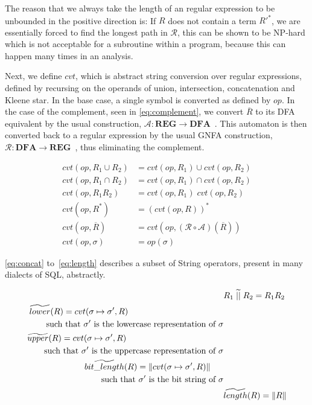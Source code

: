 The reason that we always take the length of an regular expression to be unbounded in the positive direction is: If $R$ does not contain a term $R'^*$, we are essentially forced to find the longest path in $\mathcal{R}$, this can be shown to be NP-hard which is not acceptable for a subroutine within a program, because this can happen many times in an analysis.

Next, we define $cvt$, which is abstract string conversion over regular expressions, defined by recursing on the operands of union, intersection, concatenation and Kleene star.
In the base case, a single symbol is converted as defined by $op$.
In the case of the complement, seen in \autoref{eq:complement}, we convert $\overline{R}$ to its DFA equivalent by the usual construction, $\mathcal{A}:\mathbf{REG} \rightarrow \mathbf{DFA}$~\cite{sipserbook}.
This automaton is then converted back to a regular expression by the usual GNFA construction, $\mathcal{R}: \mathbf{DFA} \rightarrow \mathbf{REG}$~\cite{sipserbook}, thus eliminating the complement.

\begin{align}
    cvt(op, R_1 \cup R_2) &= cvt(op, R_1) \cup cvt(op, R_2) \\
    cvt(op, R_1 \cap R_2) &= cvt(op, R_1) \cap cvt(op, R_2) \\
    cvt(op, R_1 R_2) &= cvt(op, R_1) \; cvt(op, R_2) \\
    cvt(op, R^*) &= (cvt(op, R))^* \\
    cvt(op, \overline{R}) &= cvt(op, (\mathcal{R} \circ \mathcal{A}) (\overline{R})) \label{eq:complement} \\
    cvt(op, \sigma) &= op(\sigma)
\end{align}

\autoref{eq:concat} to~\ref{eq:length} describes a subset of String operators, present in many dialects of SQL, abstractly.

\begin{align}
    &R_1 \;\aab{||}\; R_2 = R_1 R_2 \label{eq:concat} \\
    \begin{split}
        &\aab{lower}(R) = cvt(\sigma \mapsto \sigma', R) \\
        & \quad \quad \text{such } \text{that } \sigma' \text{ is the lowercase representation of } \sigma
    \end{split}\\
    \begin{split}
        & \aab{upper}(R) = cvt(\sigma \mapsto \sigma', R) \\
        & \quad \quad \text{such } \text{that $\sigma'$ is the uppercase representation of $\sigma$}
    \end{split}\\
    \begin{split}
        &\aab{bit\_length}(R) = \|cvt(\sigma \mapsto \sigma', R)\| \\
        & \quad \quad \text{such } \text{that $\sigma'$ is the bit string of $\sigma$}
    \end{split} \\ \label{eq:length}
    &\aab{length}(R) = \|R\|
\end{align}

